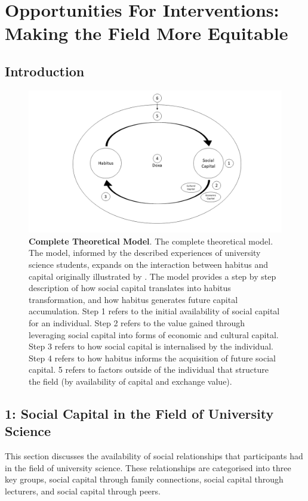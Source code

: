 \chapter[Opportunities For Interventions][]{Opportunities For Interventions: Making the Field More Equitable}


\section{Introduction}


\begin{figure}[ht]
\centering
\includegraphics[width=\textwidth]{C5 - Understanding Capital Accumulation/HabitusSocCap_TheoreticalModel.png}
\caption{\label{fig:HabitusSocCap_TheoreticalModel_C7}\textbf{Complete Theoretical Model}. The complete theoretical model. The model, informed by the described experiences of university science students, expands on the interaction between habitus and capital originally illustrated by \cite{Bourdieu1984}. The model provides a step by step description of how social capital translates into habitus transformation, and how habitus generates future capital accumulation. Step 1 refers to the initial availability of social capital for an individual. Step 2 refers to the value gained through leveraging social capital into forms of economic and cultural capital. Step 3 refers to how social capital is internalised by the individual. Step 4 refers to how habitus informs the acquisition of future social capital. 5 refers to factors outside of the individual that structure the field (by availability of capital and exchange value).}
\end{figure}

\section{1: Social Capital in the Field of University Science}
This section discusses the availability of social relationships that participants had in the field of university science. These relationships are categorised into three key groups, social capital through family connections, social capital through lecturers, and social capital through peers. 

